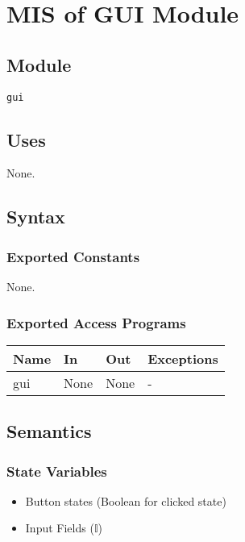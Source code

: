 \documentclass[12pt, titlepage]{article}
\begin{document}
\section{MIS of GUI Module} \label{Module_GUI}

\subsection{Module}

\texttt{gui}

\subsection{Uses}

None.

\subsection{Syntax}

\subsubsection{Exported Constants}
None.

\subsubsection{Exported Access Programs}

\begin{center}
\begin{tabular}{p{2cm} p{4cm} p{4cm} p{2cm}}
\hline
\textbf{Name} & \textbf{In} & \textbf{Out} & \textbf{Exceptions} \\
\hline
gui & None & None & - \\
\hline
\end{tabular}
\end{center}

\subsection{Semantics}

\subsubsection{State Variables}

\begin{itemize}
  \item Button states (Boolean for clicked state)
  \item Input Fields ($\mathbb{I}$)
  
\end{itemize}
\end{document}
